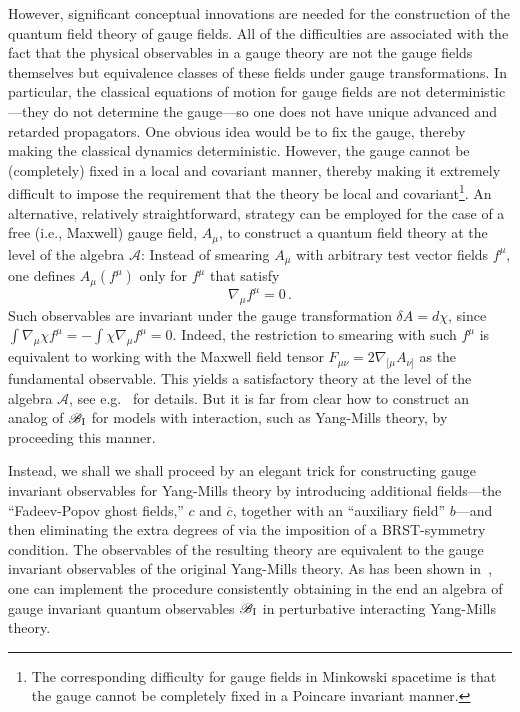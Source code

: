 \documentclass[12pt]{article}
\newcommand{\rI}{{\rm I}}
\newcommand{\eA}{\mathscr{A}}
\newcommand{\eB}{\mathscr{B}}
\theoremstyle{plain}
\theoremstyle{definition}
\def\ben{\begin{equation}}
\def\een{\end{equation}}
\begin{document}
However, significant conceptual innovations are needed for the construction of the quantum field theory of gauge fields. All of the difficulties are associated with the fact that the physical observables in a gauge theory are not the gauge fields themselves but equivalence classes of these fields under gauge transformations. In particular, the classical equations of motion for gauge fields are not deterministic---they do not determine the gauge---so one does not have unique advanced and retarded propagators. One obvious idea would be to fix the gauge, thereby making the classical dynamics deterministic. However, the gauge cannot be (completely) fixed in a local and covariant manner, thereby making it extremely difficult to impose the requirement that the theory be local and covariant\footnote{The corresponding difficulty for gauge fields in Minkowski spacetime is that the gauge cannot be completely fixed in a Poincare invariant manner.}. An alternative, relatively straightforward, strategy can be employed for the case of a free (i.e., Maxwell) gauge field, $A_\mu$, to construct a quantum field theory at the level of the algebra $\eA$: Instead of smearing $A_\mu$ with arbitrary test vector fields $f^\mu$, one defines $A_\mu (f^\mu)$ only for $f^\mu$ that satisfy
\ben
\nabla_\mu f^\mu = 0 \, .
\label{divf}
\een
Such observables are invariant under the gauge transformation $\delta A = d\chi$, since
$\int \nabla_\mu \chi f^\mu = - \int \chi \nabla_\mu f^\mu = 0$. Indeed, the restriction to smearing with such $f^\mu$ is equivalent to working with the Maxwell field tensor $F_{\mu \nu} = 2 \nabla_{[\mu} A_{\nu]}$ as the fundamental observable. This yields a satisfactory theory at the level of the algebra $\eA$, see e.g.~\cite{fewsterpf,sanders3,finster} for details. 
But it is far from clear how to construct an analog of $\eB_\rI$ for models with interaction, such as Yang-Mills theory, by proceeding this manner.

Instead, we shall we shall proceed by an elegant trick for constructing gauge invariant observables for Yang-Mills theory by
introducing additional fields---the ``Fadeev-Popov ghost fields,'' $c$ and $\overline c$, together with an ``auxiliary field'' $b$---and then eliminating the extra degrees of via the imposition of a
BRST-symmetry condition. The observables of the resulting theory are equivalent to the gauge invariant observables
of the original Yang-Mills theory. As has been shown in~\cite{h3},
one can implement the procedure consistently obtaining in the end an algebra of gauge invariant quantum observables $\eB_\rI$
in perturbative interacting Yang-Mills theory.
\end{document}
